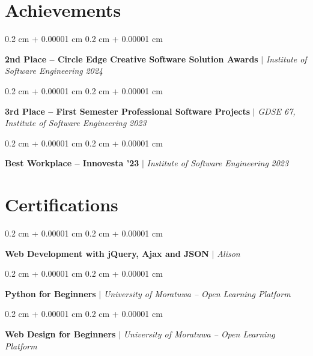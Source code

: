 \documentclass[10pt, letterpaper]{article}
\newenvironment{onecolentry}{
	\begin{adjustwidth}{
		0.2 cm + 0.00001 cm
	}{
		0.2 cm + 0.00001 cm
	}
	}{
	\end{adjustwidth}
} %
\begin{document}
	\section{Achievements}
	\begin{onecolentry}
		\textbf{2nd Place -- Circle Edge Creative Software Solution Awards} $|$ \textit{Institute of Software Engineering} \hfill \textit{2024}
	\end{onecolentry}
	\vspace{0.12 cm}
	\begin{onecolentry}
		\textbf{3rd Place -- First Semester Professional Software Projects} $|$ \textit{GDSE 67, Institute of Software Engineering} \hfill \textit{2023}
	\end{onecolentry}
	\vspace{0.12 cm}
	\begin{onecolentry}
		\textbf{Best Workplace -- Innovesta '23} $|$ \textit{Institute of Software Engineering} \hfill \textit{2023}
	\end{onecolentry}

	\section{Certifications}
	\begin{onecolentry}
		\textbf{Web Development with jQuery, Ajax and JSON} $|$ \textit{Alison}
	\end{onecolentry}
	\vspace{0.12 cm}
	\begin{onecolentry}
		\textbf{Python for Beginners} $|$ \textit{University of Moratuwa -- Open Learning Platform}
	\end{onecolentry}
	\vspace{0.12 cm}
	\begin{onecolentry}
		\textbf{Web Design for Beginners} $|$ \textit{University of Moratuwa -- Open Learning Platform}
	\end{onecolentry}

\end{document}
